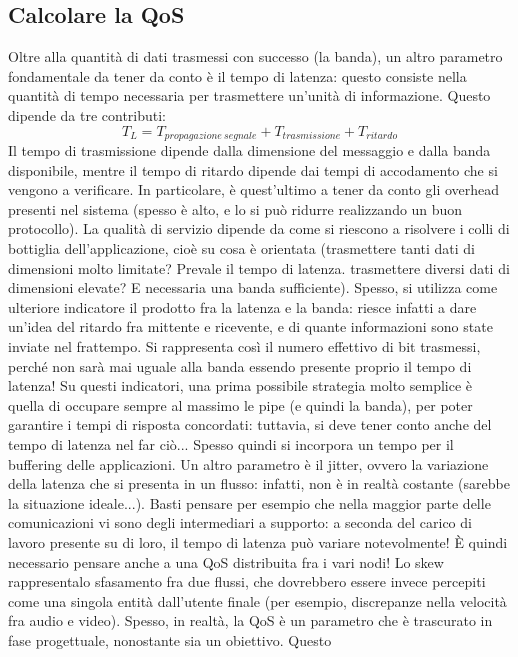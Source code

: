 \subsection{Calcolare la QoS}
Oltre alla quantità di dati trasmessi con successo (la banda), un altro parametro fondamentale da tener da conto è il
tempo di latenza: questo consiste nella quantità di tempo necessaria per trasmettere un'unità di informazione. Questo
dipende da tre contributi:
\begin{equation}
T_L = T_{propagazione\:segnale} + T_{trasmissione} + T_{ritardo}
\end{equation}
Il tempo di trasmissione dipende dalla dimensione del messaggio e dalla banda disponibile, mentre il tempo di ritardo
dipende dai tempi di accodamento che si vengono a verificare. In particolare, è quest'ultimo a tener da conto gli
overhead presenti nel sistema (spesso è alto, e lo si può ridurre realizzando un buon protocollo).
La qualità di servizio dipende da come si riescono a risolvere i colli di bottiglia dell'applicazione, cioè su cosa è
orientata (trasmettere tanti dati di dimensioni molto limitate? Prevale il tempo di latenza. trasmettere diversi dati 
di dimensioni elevate? E necessaria una banda sufficiente). Spesso, si utilizza come ulteriore indicatore il prodotto
fra la latenza e la banda: riesce infatti a dare un'idea del ritardo fra mittente e ricevente, e di quante informazioni
sono state inviate nel frattempo. Si rappresenta così il numero effettivo di bit trasmessi, perché non sarà mai uguale
alla banda essendo presente proprio il tempo di latenza! Su questi indicatori, una prima possibile strategia molto
semplice è quella di occupare sempre al massimo le pipe (e quindi la banda), per poter garantire i tempi di risposta
concordati: tuttavia, si deve tener conto anche del tempo di latenza nel far ciò... Spesso quindi si incorpora un
tempo per il buffering delle applicazioni. Un altro parametro è il jitter, ovvero la variazione della latenza che si
presenta in un flusso: infatti, non è in realtà costante (sarebbe la situazione ideale...).
Basti pensare per esempio che nella maggior parte delle comunicazioni vi sono degli intermediari a supporto: a seconda
del carico di lavoro presente su di loro, il tempo di latenza può variare notevolmente! È quindi necessario pensare
anche a una QoS distribuita fra i vari nodi!
Lo skew rappresentalo sfasamento fra due flussi, che dovrebbero essere invece percepiti come una singola entità
dall'utente finale (per esempio, discrepanze nella velocità fra audio e video).
Spesso, in realtà, la QoS è un parametro che è trascurato in fase progettuale, nonostante sia un obiettivo. Questo
